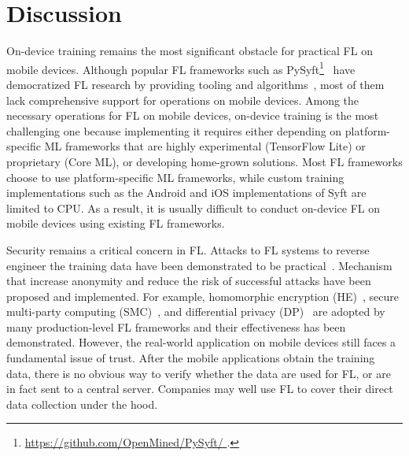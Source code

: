 \documentclass[conference]{IEEEtran}
\begin{document}
\section{Discussion}

\label{sec:discussion}


On-device training remains the most significant obstacle for
practical FL on mobile devices.
Although popular FL frameworks such as
PySyft\footnote{\url{
    https://github.com/OpenMined/PySyft/
}.}~\cite{ryffel2018generic,Ziller2021,hall2021syft}
have democratized FL research by providing tooling and
algorithms~\cite{sriraman2022device},
most of them lack comprehensive support for operations on mobile devices.
Among the necessary operations for FL on mobile devices,
on-device training is the most challenging one because
implementing it requires either depending on
platform-specific ML frameworks that are highly experimental (TensorFlow Lite)
or proprietary (Core ML),
or developing home-grown solutions.
Most FL frameworks choose to use platform-specific ML frameworks,
while custom training implementations such as
the Android and iOS implementations of Syft are limited to CPU.
As a result, it is usually difficult to conduct on-device FL
on mobile devices using existing FL frameworks.

Security remains a critical concern in FL.
Attacks to FL systems to reverse engineer the training data have been
demonstrated to be practical~\cite{sun2019really}.
Mechanism that increase anonymity and
reduce the risk of successful attacks have been proposed and implemented.
For example,
homomorphic encryption (HE)~\cite{wang2020homo},
secure multi-party computing (SMC)~\cite{bonawitz2016practical}, and
differential privacy
(DP)~\cite{dwork2006differential,geyer2017differentially} are
adopted by many production-level FL frameworks and
their effectiveness has been demonstrated.
However, the real-world application on mobile devices still faces a fundamental
issue of trust.
After the mobile applications obtain the training data,
there is no obvious way to verify whether the data are used for FL,
or are in fact sent to a central server.
Companies may well use FL to cover their direct data collection under the hood.

\printbibliography

\end{document}
